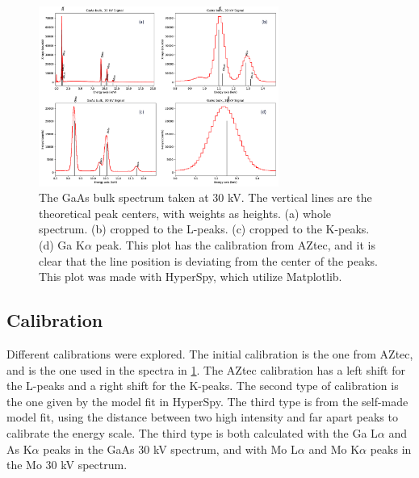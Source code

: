\begin{figure}[h]
    \centering
    \includegraphics[width=0.70\textwidth]{figures/GaAs30kV_HS.png}
    \caption{
        The GaAs bulk spectrum taken at 30 kV.
        The vertical lines are the theoretical peak centers, with weights as heights.
        (a) whole spectrum.
        (b) cropped to the L-peaks.
        (c) cropped to the K-peaks.
        (d) Ga K$\alpha$ peak.
        This plot has the calibration from AZtec, and it is clear that the line position is deviating from the center of the peaks.
        This plot was made with HyperSpy, which utilize Matplotlib.
    }
    \label{fig:GaAs30kV_HS}
\end{figure}







\subsection{Calibration}
\label{sec:results:qualitative:calibration}

Different calibrations were explored.
The initial calibration is the one from AZtec, and is the one used in the spectra in \cref{fig:GaAs30kV_HS}.
The AZtec calibration has a left shift for the L-peaks and a right shift for the K-peaks.
The second type of calibration is the one given by the model fit in HyperSpy.
The third type is from the self-made model fit, using the distance between two high intensity and far apart peaks to calibrate the energy scale.
The third type is both calculated with the Ga L$\alpha$ and As K$\alpha$ peaks in the GaAs 30 kV spectrum, and with Mo L$\alpha$ and Mo K$\alpha$ peaks in the Mo 30 kV spectrum.

